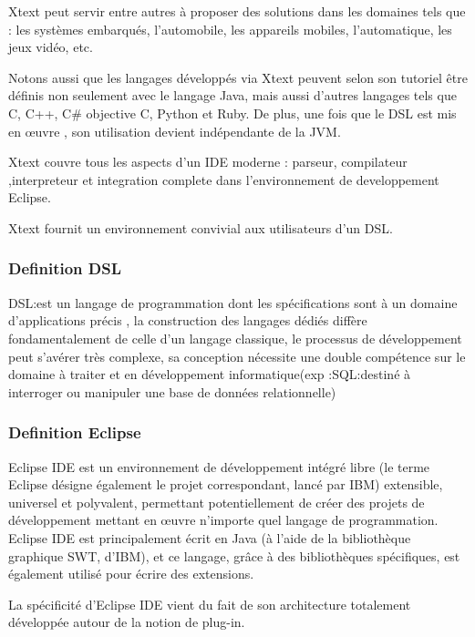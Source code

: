 \documentclass{article}
\begin{document}
{Xtext peut servir entre autres à proposer des solutions dans les domaines tels que : les systèmes embarqués, l'automobile, les appareils mobiles, l'automatique, les jeux vidéo, etc.

Notons aussi que les langages développés via Xtext peuvent selon son tutoriel être définis non seulement avec le langage Java, mais aussi d'autres langages tels que C, C++, C# objective C, Python et Ruby. De plus, une fois que le DSL est mis en œuvre , son utilisation devient indépendante de la JVM. 

Xtext couvre tous les aspects d’un IDE moderne : parseur, compilateur ,interpreteur et integration complete dans l’environnement de developpement Eclipse.

Xtext fournit un environnement convivial aux utilisateurs d’un DSL.

\subsubsection{Definition DSL}
DSL:est un langage de programmation dont les spécifications sont à un domaine d’applications précis , la construction des langages dédiés diffère fondamentalement de celle d’un langage classique, le processus de développement  peut s'avérer très complexe, sa conception nécessite une double compétence sur le domaine à traiter et en développement informatique(exp :SQL:destiné à interroger ou manipuler une base de données relationnelle)

\subsubsection{Definition Eclipse}
Eclipse IDE est un environnement de développement intégré libre (le terme Eclipse désigne également le projet correspondant, lancé par IBM) extensible, universel et polyvalent, permettant potentiellement de créer des projets de développement mettant en œuvre n'importe quel langage de programmation. Eclipse IDE est principalement écrit en Java (à l'aide de la bibliothèque graphique SWT, d'IBM), et ce langage, grâce à des bibliothèques spécifiques, est également utilisé pour écrire des extensions.

La spécificité d'Eclipse IDE vient du fait de son architecture totalement développée autour de la notion de plug-in.


}
\end{document}
